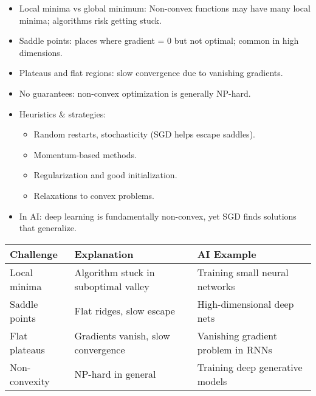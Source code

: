 \documentclass[
  letterpaper,
  DIV=11,
  numbers=noendperiod]{scrreprt}
\providecommand{\tightlist}{%
  \setlength{\itemsep}{0pt}\setlength{\parskip}{0pt}}
\begin{document}
\begin{itemize}
\item
  Local minima vs global minimum: Non-convex functions may have many
  local minima; algorithms risk getting stuck.
\item
  Saddle points: places where gradient = 0 but not optimal; common in
  high dimensions.
\item
  Plateaus and flat regions: slow convergence due to vanishing
  gradients.
\item
  No guarantees: non-convex optimization is generally NP-hard.
\item
  Heuristics \& strategies:

  \begin{itemize}
  \tightlist
  \item
    Random restarts, stochasticity (SGD helps escape saddles).
  \item
    Momentum-based methods.
  \item
    Regularization and good initialization.
  \item
    Relaxations to convex problems.
  \end{itemize}
\item
  In AI: deep learning is fundamentally non-convex, yet SGD finds
  solutions that generalize.
\end{itemize}

\begin{longtable}[]{@{}
  >{\raggedright\arraybackslash}p{}
  >{\raggedright\arraybackslash}p{}
  >{\raggedright\arraybackslash}p{}@{}}
\toprule\noalign{}
\begin{minipage}[b]{\linewidth}\raggedright
Challenge
\end{minipage} & \begin{minipage}[b]{\linewidth}\raggedright
Explanation
\end{minipage} & \begin{minipage}[b]{\linewidth}\raggedright
AI Example
\end{minipage} \\
\midrule\noalign{}
\endhead
\bottomrule\noalign{}
\endlastfoot
Local minima & Algorithm stuck in suboptimal valley & Training small
neural networks \\
Saddle points & Flat ridges, slow escape & High-dimensional deep nets \\
Flat plateaus & Gradients vanish, slow convergence & Vanishing gradient
problem in RNNs \\
Non-convexity & NP-hard in general & Training deep generative models \\
\end{longtable}
\end{document}
